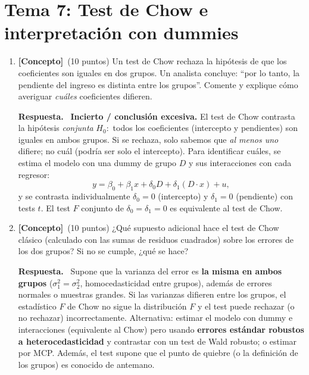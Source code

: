 \documentclass[12pt,letterpaper]{article}
\newenvironment{resp}{\begingroup\color{blue}\par\noindent\textbf{Respuesta.}\ }{\par\endgroup}
\newcommand{\tema}[1]{\section*{#1}}
\newcommand{\conc}{\textbf{[Concepto]}}
\begin{document}
\newpage
\tema{Tema 7: Test de Chow e interpretación con dummies}

\begin{enumerate}[1.]

\item \conc\ (10 puntos) Un test de Chow rechaza la hipótesis de que los coeficientes son iguales en dos grupos. Un analista concluye: ``por lo tanto, la pendiente del ingreso es distinta entre los grupos''. Comente y explique cómo averiguar \emph{cuáles} coeficientes difieren.

\begin{resp}
\textbf{Incierto / conclusión excesiva.} El test de Chow contrasta la hipótesis \emph{conjunta} $H_0:$ todos los coeficientes (intercepto y pendientes) son iguales en ambos grupos. Si se rechaza, solo sabemos que \emph{al menos uno} difiere; no cuál (podría ser solo el intercepto). Para identificar cuáles, se estima el modelo con una dummy de grupo $D$ y sus interacciones con cada regresor:
\[
y=\beta_0+\beta_1x+\delta_0D+\delta_1(D\cdot x)+u ,
\]
y se contrasta individualmente $\delta_0=0$ (intercepto) y $\delta_1=0$ (pendiente) con tests $t$. El test $F$ conjunto de $\delta_0=\delta_1=0$ es equivalente al test de Chow.
\end{resp}

\item \conc\ (10 puntos) ¿Qué supuesto adicional hace el test de Chow clásico (calculado con las sumas de residuos cuadrados) sobre los errores de los dos grupos? Si no se cumple, ¿qué se hace?

\begin{resp}
Supone que la varianza del error es \textbf{la misma en ambos grupos} ($\sigma_1^2=\sigma_2^2$, homocedasticidad entre grupos), además de errores normales o muestras grandes. Si las varianzas difieren entre los grupos, el estadístico $F$ de Chow no sigue la distribución $F$ y el test puede rechazar (o no rechazar) incorrectamente. Alternativa: estimar el modelo con dummy e interacciones (equivalente al Chow) pero usando \textbf{errores estándar robustos a heterocedasticidad} y contrastar con un test de Wald robusto; o estimar por MCP. Además, el test supone que el punto de quiebre (o la definición de los grupos) es conocido de antemano.
\end{resp}


\end{enumerate}
\end{document}
